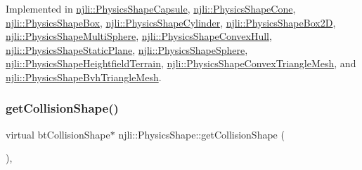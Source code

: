 Implemented in \mbox{\hyperlink{classnjli_1_1_physics_shape_capsule_a1a319c965b9b504353759dd8729944e1}{njli\+::\+Physics\+Shape\+Capsule}}, \mbox{\hyperlink{classnjli_1_1_physics_shape_cone_a39f88d5fcc1139aa139c9d9163240e9a}{njli\+::\+Physics\+Shape\+Cone}}, \mbox{\hyperlink{classnjli_1_1_physics_shape_box_a5b2c32f5353b66f77a44fa53fde65d60}{njli\+::\+Physics\+Shape\+Box}}, \mbox{\hyperlink{classnjli_1_1_physics_shape_cylinder_aa3676c39e8377b6798b034b67ba07d31}{njli\+::\+Physics\+Shape\+Cylinder}}, \mbox{\hyperlink{classnjli_1_1_physics_shape_box2_d_ad8d9342f3ef94ae2426cec1c771c0208}{njli\+::\+Physics\+Shape\+Box2D}}, \mbox{\hyperlink{classnjli_1_1_physics_shape_multi_sphere_a3e11137ac6e9e9ef6e76ee396db9297a}{njli\+::\+Physics\+Shape\+Multi\+Sphere}}, \mbox{\hyperlink{classnjli_1_1_physics_shape_convex_hull_aa8378f7e3af08e778dce0b416c8e0bfa}{njli\+::\+Physics\+Shape\+Convex\+Hull}}, \mbox{\hyperlink{classnjli_1_1_physics_shape_static_plane_a59b7263115001da7a90c30b375ac6b80}{njli\+::\+Physics\+Shape\+Static\+Plane}}, \mbox{\hyperlink{classnjli_1_1_physics_shape_sphere_a75ab9287d8f5c36ea782f4b7fb9535d6}{njli\+::\+Physics\+Shape\+Sphere}}, \mbox{\hyperlink{classnjli_1_1_physics_shape_heightfield_terrain_a2de5e5e8c2d159963c46664d7ec4ab10}{njli\+::\+Physics\+Shape\+Heightfield\+Terrain}}, \mbox{\hyperlink{classnjli_1_1_physics_shape_convex_triangle_mesh_aacb06bac718d0ad96b0bf2b2b5f4d3dd}{njli\+::\+Physics\+Shape\+Convex\+Triangle\+Mesh}}, and \mbox{\hyperlink{classnjli_1_1_physics_shape_bvh_triangle_mesh_a8e2e34bd218b74d7f03c0bdcdf142901}{njli\+::\+Physics\+Shape\+Bvh\+Triangle\+Mesh}}.

\mbox{\label{classnjli_1_1_physics_shape_a2910f0362035c971f245349a55378b01}} 
\subsubsection{\texorpdfstring{get\+Collision\+Shape()}{getCollisionShape()}\hspace{0.1cm}{\footnotesize\ttfamily [2/2]}}
{\footnotesize\ttfamily virtual bt\+Collision\+Shape$\ast$ njli\+::\+Physics\+Shape\+::get\+Collision\+Shape (\begin{DoxyParamCaption}{ }\end{DoxyParamCaption})\hspace{0.3cm}{\ttfamily [protected]}, {}}




